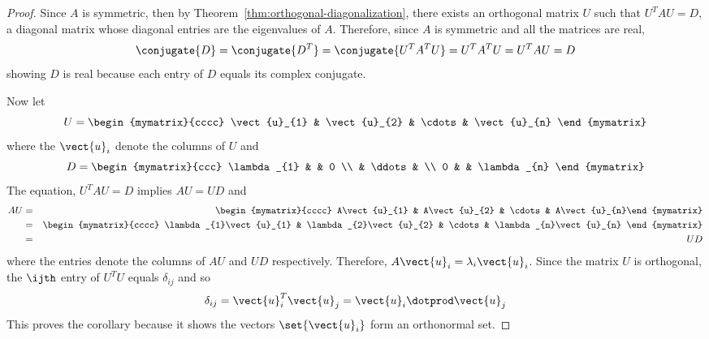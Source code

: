 \begin{proof}
Since $A$ is symmetric, then by Theorem~\ref{thm:orthogonal-diagonalization},
there exists an orthogonal matrix $U$ such that $U^{T}AU=D$, a diagonal
matrix whose diagonal entries are the eigenvalues of $A$. Therefore, since $
A $ is symmetric and all the matrices are real,
\begin{equation*}
\conjugate{D}=\conjugate{D^{T}}=\conjugate{U^{T}A^{T}U}=U^{T}A^{T}U=U^{T}AU=D
\end{equation*}
showing $D$ is real because each entry of $D$ equals its complex conjugate.

Now let
\begin{equation*}
U=\begin{mymatrix}{cccc}
\vect{u}_{1} & \vect{u}_{2} & \cdots & \vect{u}_{n}
\end{mymatrix}
\end{equation*}
where the $\vect{u}_{i}$ denote the columns of $U$ and
\begin{equation*}
D=\begin{mymatrix}{ccc}
\lambda _{1} &  & 0 \\
& \ddots &  \\
0 &  & \lambda _{n}
\end{mymatrix}
\end{equation*}
The equation, $U^{T}AU=D$ implies $AU = UD$ and
\begin{eqnarray*}
AU &=&\begin{mymatrix}{cccc}
A\vect{u}_{1} & A\vect{u}_{2} & \cdots & A\vect{u}_{n}%
\end{mymatrix} \\
&=&\begin{mymatrix}{cccc}
\lambda _{1}\vect{u}_{1} & \lambda _{2}\vect{u}_{2} & \cdots & \lambda
_{n}\vect{u}_{n}
\end{mymatrix} \\
&=& UD
\end{eqnarray*}
where the entries denote the columns of $AU$ and $UD$ respectively.
Therefore, $A\vect{u}_{i}=\lambda _{i}\vect{u}_{i}$.  Since the matrix $U$
is orthogonal, the $\ijth$ entry of $U^{T}U$ equals $\delta _{ij}$ and so
\begin{equation*}
\delta _{ij}=\vect{u}_{i}^{T}\vect{u}_{j}=\vect{u}_{i}\dotprod \vect{u}
_{j}
\end{equation*}
This proves the corollary because it shows the vectors $\set{\vect{u}
_{i}} $ form an orthonormal set.
\end{proof}

